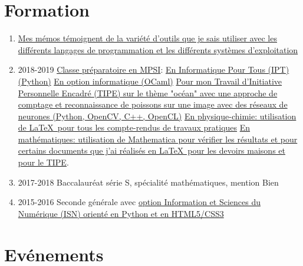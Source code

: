 \documentclass{article}
\begin{document}
	\section{Formation}

	\begin{enumerate}

		\item \href{https://github.com/Benjamin-Loison/Memos}{Mes mémos témoignent de la variété d'outils que je sais utiliser avec les différents langages de programmation et les différents systèmes d'exploitation}
		\item 2018-2019 \href{https://github.com/Benjamin-Loison/MPSI1}{Classe préparatoire en MPSI}:
			\subitem \href{https://github.com/Benjamin-Loison/MPSI1/tree/master/IPT\%20TPs}{En Informatique Pour Tous (IPT) (Python)}
			\subitem \href{https://github.com/Benjamin-Loison/MPSI1/tree/master/OCaml\%20TPs}{En option informatique (OCaml)}
			\subitem \href{https://github.com/Benjamin-Loison/MPSI1/tree/master/TIPE}{Pour mon Travail d'Initiative Personnelle Encadré (TIPE) sur le thème "océan" avec une approche de comptage et reconnaissance de poissons sur une image avec des réseaux de neurones (Python, OpenCV, C++, OpenCL)}
			\subitem \href{https://github.com/Benjamin-Loison/MPSI1/blob/master/Physic-chemistry.zip}{En physique-chimie: utilisation de \LaTeX\ pour tous les compte-rendus de travaux pratiques}
			\subitem \href{https://github.com/Benjamin-Loison/MPSI1/tree/master/Mathematics}{En mathématiques: utilisation de Mathematica pour vérifier les résultats
			et pour certains documents que j'ai réalisés en \LaTeX\ pour les devoirs maisons et pour le TIPE}.
		\item 2017-2018 Baccalauréat série S, spécialité mathématiques, mention Bien
		\item 2015-2016 Seconde générale avec \href{https://github.com/Benjamin-Loison/ISN-2-nde-French-educationnal-system-}{option Information et Sciences du Numérique (ISN) orienté en Python et en HTML5/CSS3}
		
	\end{enumerate}

	\section{Evénements}
\end{document}
